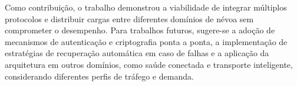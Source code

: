Como contribuição, o trabalho demonstrou a viabilidade de integrar múltiplos protocolos e distribuir cargas entre diferentes domínios de névoa sem comprometer o desempenho. Para trabalhos futuros, sugere-se a adoção de mecanismos de autenticação e criptografia ponta a ponta, a implementação de estratégias de recuperação automática em caso de falhas e a aplicação da arquitetura em outros domínios, como saúde conectada e transporte inteligente, considerando diferentes perfis de tráfego e demanda.
